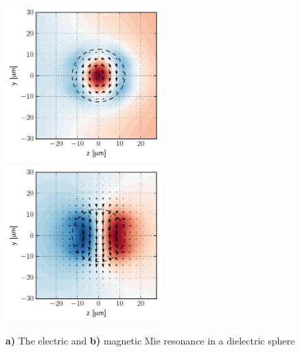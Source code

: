 \begin{figure} \caption{\textbf{a)} The electric and \textbf{b)} magnetic Mie resonance in a dielectric sphere}  \centering \includegraphics[width=6cm]{img/sphere_Mie_mode_electric.pdf} 
 \centering \includegraphics[width=6cm]{img/sphere_Mie_mode_magnetic.pdf} \end{figure}


